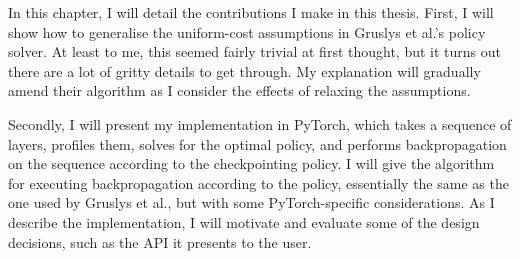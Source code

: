 In this chapter, I will detail the contributions I make in this thesis.
First, I will show how to generalise the uniform-cost assumptions in Gruslys et al.'s policy solver.
At least to me, this seemed fairly trivial at first thought, but it turns out there are a lot of gritty details to get through.
My explanation will gradually amend their algorithm as I consider the effects of relaxing the assumptions.

Secondly, I will present my implementation in PyTorch, which takes a sequence of layers, profiles them, solves for the optimal policy, and performs backpropagation on the sequence according to the checkpointing policy.
I will give the algorithm for executing backpropagation according to the policy, essentially the same as the one used by Gruslys et al., but with some PyTorch-specific considerations.
As I describe the implementation, I will motivate and evaluate some of the design decisions, such as the API it presents to the user.
